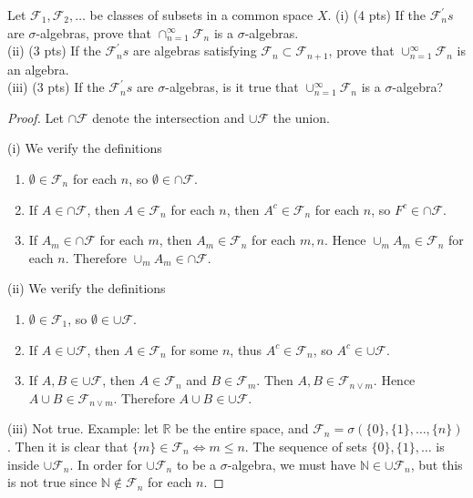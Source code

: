 \begin{problem}
	Let $\mathcal{F}_1, \mathcal{F}_2, \ldots$ be classes of subsets in a common space $X$.
(i) (4 pts) If the $\mathcal{F}_n^{\prime} s$ are $\sigma$-algebras, prove that $\cap_{n=1}^{\infty} \mathcal{F}_n$ is a $\sigma$-algebras.\\
(ii) (3 pts) If the $\mathcal{F}_n^{\prime} s$ are algebras satisfying $\mathcal{F}_n \subset \mathcal{F}_{n+1}$, prove that $\cup_{n=1}^{\infty} \mathcal{F}_n$ is an algebra.\\
(iii) (3 pts) If the $\mathcal{F}_n^{\prime} s$ are $\sigma$-algebras, is it true that $\cup_{n=1}^{\infty} \mathcal{F}_n$ is a $\sigma$-algebra?
\end{problem}
\begin{proof}
	Let $\cap \mathcal{F}$ denote the intersection and $\cup \mathcal{F}$ the union.

	(i) We verify the definitions
	\begin{enumerate}
		\item $\emptyset  \in \mathcal{F}_n$ for each $n$, so $\emptyset  \in \cap \mathcal{F}$.
		\item If $A \in \cap \mathcal{F}$, then $A \in \mathcal{F}_n$ for each $n$, then $A^c \in \mathcal{F}_n$ for each $n$, so $F^c \in \cap \mathcal{F}$.
		\item If $A_m \in \cap \mathcal{F}$ for each $m$, then $A_m \in \mathcal{F}_n$ for each $m, n$. Hence $\cup_m A_m \in \mathcal{F}_n$ for each $n$. Therefore $\cup _m A_m \in \cap \mathcal{F}$.
	\end{enumerate}

	(ii) We verify the definitions
	\begin{enumerate}
		\item $\emptyset \in \mathcal{F}_1$, so $\emptyset \in \cup \mathcal{F}$.
		\item If  $A \in \cup \mathcal{F}$, then $A \in \mathcal{F}_n$ for some $n$, thus $A^c \in \mathcal{F}_n$, so $A^c \in \cup \mathcal{F}$.
		\item If $A, B \in \cup \mathcal{F}$, then $A \in \mathcal{F}_n$ and $B \in \mathcal{F}_m$. Then $A, B \in \mathcal{F}_{n \vee m}$. Hence $A \cup B \in \mathcal{F}_{n \vee m}$. Therefore $A \cup B \in \cup \mathcal{F}$.
	\end{enumerate}

	(iii) Not true. Example: let $\mathbb{\mathbb{R}}$ be the entire space, and $\mathcal{F}_n = \sigma(\{0\} , \{1\}, \ldots, \{n\})$. Then it is clear that $\{m\}  \in \mathcal{F}_n \iff  m \le n$. The sequence of sets $\{0\} , \{ 1\} , \ldots$ is inside $\cup \mathcal{F}_n$. In order for $\cup \mathcal{F}_n$ to be a $\sigma$-algebra, we must have $\mathbb{N} \in \cup \mathcal{F}_n$, but this is not true since $\mathbb{N} \not\in \mathcal{F}_n$ for each $n$.
\end{proof}

